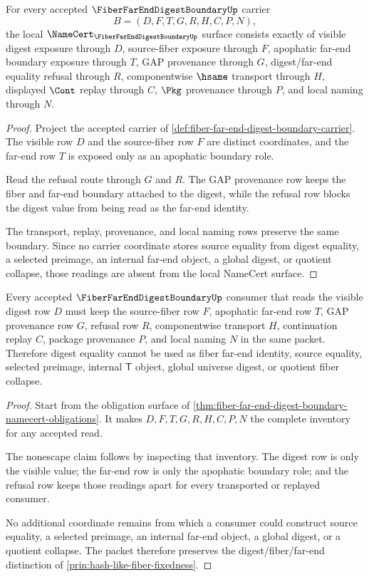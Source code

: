 \begin{theorem}
\label{thm:fiber-far-end-digest-boundary-namecert-obligations}
For every accepted $\FiberFarEndDigestBoundaryUp$ carrier
$$
B=(D,F,T,G,R,H,C,P,N),
$$
the local $\NameCert_{\FiberFarEndDigestBoundaryUp}$ surface consists exactly of visible digest exposure through $D$, source-fiber exposure through $F$, apophatic far-end boundary exposure through $T$, GAP provenance through $G$, digest/far-end equality refusal through $R$, componentwise $\hsame$ transport through $H$, displayed $\Cont$ replay through $C$, $\Pkg$ provenance through $P$, and local naming through $N$.
\end{theorem}
\begin{proof}
Project the accepted carrier of \autoref{def:fiber-far-end-digest-boundary-carrier}. The visible row $D$ and the source-fiber row $F$ are distinct coordinates, and the far-end row $T$ is exposed only as an apophatic boundary role.

Read the refusal route through $G$ and $R$. The GAP provenance row keeps the fiber and far-end boundary attached to the digest, while the refusal row blocks the digest value from being read as the far-end identity.

The transport, replay, provenance, and local naming rows preserve the same boundary. Since no carrier coordinate stores source equality from digest equality, a selected preimage, an internal far-end object, a global digest, or quotient collapse, those readings are absent from the local NameCert surface.
\end{proof}

\begin{theorem}
\label{thm:fiber-far-end-digest-boundary-nonescape}
Every accepted $\FiberFarEndDigestBoundaryUp$ consumer that reads the visible digest row $D$ must keep the source-fiber row $F$, apophatic far-end row $T$, GAP provenance row $G$, refusal row $R$, componentwise transport $H$, continuation replay $C$, package provenance $P$, and local naming $N$ in the same packet. Therefore digest equality cannot be used as fiber far-end identity, source equality, selected preimage, internal $\mathsf{T}$ object, global universe digest, or quotient fiber collapse.
\end{theorem}
\begin{proof}
Start from the obligation surface of \autoref{thm:fiber-far-end-digest-boundary-namecert-obligations}. It makes $D,F,T,G,R,H,C,P,N$ the complete inventory for any accepted read.

The nonescape claim follows by inspecting that inventory. The digest row is only the visible value; the far-end row is only the apophatic boundary role; and the refusal row keeps those readings apart for every transported or replayed consumer.

No additional coordinate remains from which a consumer could construct source equality, a selected preimage, an internal far-end object, a global digest, or a quotient collapse. The packet therefore preserves the digest/fiber/far-end distinction of \autoref{prin:hash-like-fiber-fixedness}.
\end{proof}

